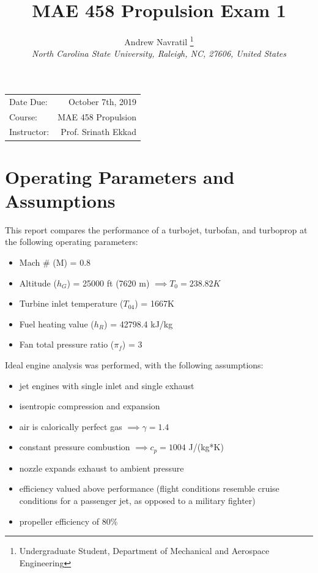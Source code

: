 \documentclass[]{aiaa-tc}%
\title{MAE 458 Propulsion Exam 1}
\author{Andrew Navratil%
    \thanks{Undergraduate Student, Department of Mechanical and Aerospace Engineering}\\
 {\normalsize\itshape
  North Carolina State University, Raleigh, NC, 27606, United States}
 }
\begin{document}
\maketitle

\begin{center}
\begin{tabular}{l r}
Date Due: & October 7th, 2019\\
Course: & MAE 458 Propulsion \\ %
Instructor: & Prof. Srinath Ekkad %
\end{tabular}
\end{center}


\section{Operating Parameters and Assumptions}

This report compares the performance of a turbojet, turbofan, and turboprop at the following operating parameters\cite{handout}:

\begin{itemize}
	\item Mach \# (M) = 0.8
	\item Altitude ($h_{G}$) = 25000 ft (7620 m) $\implies T_{0} = 238.82K$\cite{anderson}
	\item Turbine inlet temperature ($T_{04}$) = 1667K
	\item Fuel heating value ($h_{R}$) = 42798.4 kJ/kg
	\item Fan total pressure ratio ($\pi_{f}$) = 3
\end{itemize}

\noindent
Ideal engine analysis was performed, with the following assumptions:

\begin{itemize}
	\item jet engines with single inlet and single exhaust
	\item isentropic compression and expansion
	\item air is calorically perfect gas $\implies \gamma = 1.4$
	\item constant pressure combustion $\implies c_{p} = 1004$ J/(kg*K)
	\item nozzle expands exhaust to ambient pressure
	\item efficiency valued above performance (flight conditions resemble cruise conditions for a passenger jet, as opposed to a military fighter)
	\item propeller efficiency of 80\%
\end{itemize}
\end{document}
